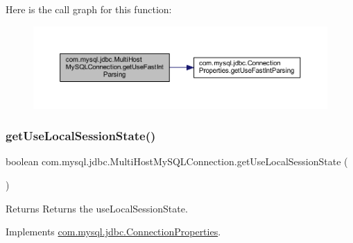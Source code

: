 Here is the call graph for this function\+:
\nopagebreak
\begin{figure}[H]
\begin{center}
\leavevmode
\includegraphics[width=350pt]{classcom_1_1mysql_1_1jdbc_1_1_multi_host_my_s_q_l_connection_ac96f1a2219ce5549d6d205687484734e_cgraph}
\end{center}
\end{figure}
\mbox{\label{classcom_1_1mysql_1_1jdbc_1_1_multi_host_my_s_q_l_connection_a816d458e4e3e4cd753a31b84055deef7}} 
\subsubsection{\texorpdfstring{get\+Use\+Local\+Session\+State()}{getUseLocalSessionState()}}
{\footnotesize\ttfamily boolean com.\+mysql.\+jdbc.\+Multi\+Host\+My\+S\+Q\+L\+Connection.\+get\+Use\+Local\+Session\+State (\begin{DoxyParamCaption}{ }\end{DoxyParamCaption})}

\begin{DoxyReturn}{Returns}
Returns the use\+Local\+Session\+State. 
\end{DoxyReturn}


Implements \mbox{\hyperlink{interfacecom_1_1mysql_1_1jdbc_1_1_connection_properties_a415c18a036cfda4e12ac4c6952a303b1}{com.\+mysql.\+jdbc.\+Connection\+Properties}}.

